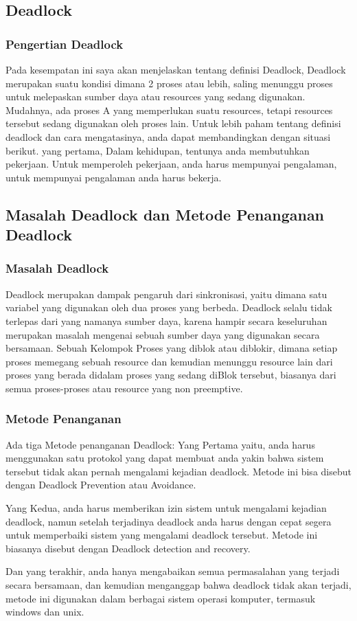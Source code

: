 

\subsection {Deadlock}
\subsubsection {Pengertian Deadlock}
	Pada kesempatan ini saya akan menjelaskan tentang definisi Deadlock, Deadlock merupakan suatu kondisi dimana 2 proses atau lebih, saling menunggu proses untuk melepaskan sumber daya atau resources yang sedang digunakan. Mudahnya, ada proses A yang memperlukan suatu resources, tetapi resources tersebut sedang digunakan oleh proses lain. Untuk lebih paham tentang definisi deadlock dan cara mengatasinya, anda dapat membandingkan dengan situasi berikut. yang pertama, Dalam kehidupan, tentunya anda membutuhkan pekerjaan. Untuk memperoleh pekerjaan, anda harus mempunyai pengalaman, untuk mempunyai pengalaman anda harus bekerja.
	
\subsection {Masalah Deadlock dan Metode Penanganan Deadlock}
\subsubsection {Masalah Deadlock}
	Deadlock merupakan dampak pengaruh dari sinkronisasi, yaitu dimana satu variabel yang digunakan oleh dua proses yang berbeda. Deadlock selalu tidak terlepas dari yang namanya sumber daya, karena hampir secara keseluruhan merupakan masalah mengenai sebuah sumber daya yang digunakan secara bersamaan. Sebuah Kelompok Proses yang diblok atau diblokir, dimana setiap proses memegang sebuah resource dan kemudian menunggu resource lain dari proses yang berada didalam proses yang sedang diBlok tersebut, biasanya dari semua proses-proses atau resource yang non preemptive.
	
\subsubsection {Metode Penanganan}
	Ada tiga Metode penanganan Deadlock:
	Yang Pertama yaitu, anda harus menggunakan satu protokol yang dapat membuat anda yakin bahwa sistem tersebut tidak akan pernah mengalami kejadian deadlock. Metode ini bisa disebut dengan Deadlock Prevention atau Avoidance.
	
	Yang Kedua, anda harus memberikan izin sistem untuk mengalami kejadian deadlock, namun setelah terjadinya deadlock anda harus dengan cepat segera untuk memperbaiki sistem yang mengalami deadlock tersebut. Metode ini biasanya disebut dengan Deadlock detection and recovery.
	
	Dan yang terakhir, anda hanya mengabaikan semua permasalahan yang terjadi secara bersamaan, dan kemudian menganggap bahwa deadlock tidak akan terjadi, metode ini digunakan dalam berbagai sistem operasi komputer, termasuk windows dan unix.